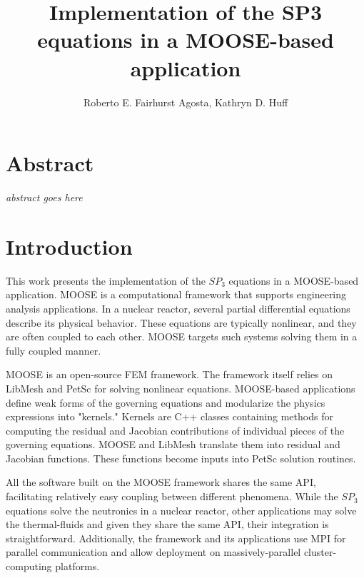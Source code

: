 \documentclass{anstrans}
\title{Implementation of the SP3 equations in a MOOSE-based application}
\author{Roberto E. Fairhurst Agosta, Kathryn D. Huff}
\institute{
University of Illinois at Urbana-Champaign, Dept. of Nuclear, Plasma, and Radiological Engineering\\
ref3@illinois.edu
}
\begin{document}

\section{Abstract}

\textit{abstract goes here}

\section{Introduction}

This work presents the implementation of the $SP_3$ equations \cite{gelbard_spherical_1960} in a \gls{MOOSE}-based application.
MOOSE \cite{gaston_moose_2009} is a computational framework that supports engineering analysis applications.
In a nuclear reactor, several partial differential equations describe its physical behavior.
These equations are typically nonlinear, and they are often coupled to each other.
MOOSE targets such systems solving them in a fully coupled manner.

MOOSE is an open-source \gls{FEM} framework.
The framework itself relies on LibMesh \cite{kirk_libmesh_2006} and PetSc \cite{balay_petsc_2016} for solving nonlinear equations.
MOOSE-based applications define weak forms of the governing equations and modularize the physics expressions into "kernels."
Kernels are C++ classes containing methods for computing the residual and Jacobian contributions of individual pieces of the governing equations.
MOOSE and LibMesh translate them into residual and Jacobian functions.
These functions become inputs into PetSc solution routines.

All the software built on the MOOSE framework shares the same \gls{API}, facilitating relatively easy coupling between different phenomena.
While the $SP_3$ equations solve the neutronics in a nuclear reactor, other applications may solve the thermal-fluids and given they share the same API, their integration is straightforward.
Additionally, the framework and its applications use \gls{MPI} for parallel communication and allow deployment on massively-parallel cluster-computing platforms.
\end{document}
